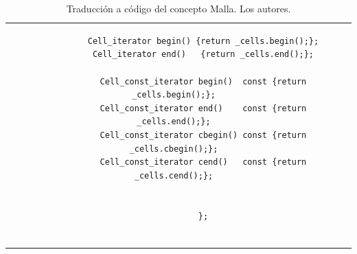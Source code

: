 \begin{table}[h]
\begin{tabular}{cc}
\begin{tiny}
\begin{lstlisting}
			Cell_iterator begin() {return _cells.begin();};
			Cell_iterator end()   {return _cells.end();};
			
			Cell_const_iterator begin()  const {return _cells.begin();};
			Cell_const_iterator end()    const {return _cells.end();};
			Cell_const_iterator cbegin() const {return _cells.cbegin();};
			Cell_const_iterator cend()   const {return _cells.cend();};
			

			};
			
			\end{lstlisting}
		\end{tiny}
	\end{tabular}
	\label{tab:MeshCode}
	\caption[Traducción a código del concepto Malla.]{Traducción a código del concepto Malla. Los autores.}
\end{table}



